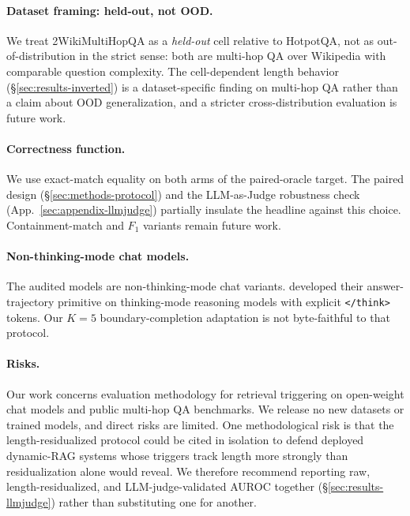 \documentclass[11pt]{article}
\begin{document}
\paragraph{Dataset framing: held-out, not OOD.} We treat 2WikiMultiHopQA as a \emph{held-out} cell relative to HotpotQA, not as out-of-distribution in the strict sense: both are multi-hop QA over Wikipedia with comparable question complexity. The cell-dependent length behavior (\S\ref{sec:results-inverted}) is a dataset-specific finding on multi-hop QA rather than a claim about OOD generalization, and a stricter cross-distribution evaluation is future work.

\paragraph{Correctness function.} We use exact-match equality on both arms of the paired-oracle target. The paired design (\S\ref{sec:methods-protocol}) and the LLM-as-Judge robustness check (App.~\ref{sec:appendix-llmjudge}) partially insulate the headline against this choice. Containment-match and $F_1$ variants remain future work.

\paragraph{Non-thinking-mode chat models.} The audited models are non-thinking-mode chat variants. \citet{datta_large_2026} developed their answer-trajectory primitive on thinking-mode reasoning models with explicit \texttt{</think>} tokens. Our $K{=}5$ boundary-completion adaptation is not byte-faithful to that protocol.

\paragraph{Risks.} Our work concerns evaluation methodology for retrieval triggering on open-weight chat models and public multi-hop QA benchmarks. We release no new datasets or trained models, and direct risks are limited. One methodological risk is that the length-residualized protocol could be cited in isolation to defend deployed dynamic-RAG systems whose triggers track length more strongly than residualization alone would reveal. We therefore recommend reporting raw, length-residualized, and LLM-judge-validated AUROC together (\S\ref{sec:results-llmjudge}) rather than substituting one for another.


\end{document}
